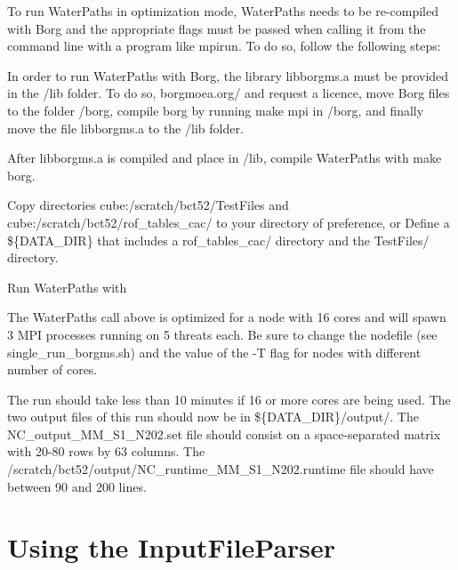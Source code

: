 To run Water\+Paths in optimization mode, Water\+Paths needs to be re-\/compiled with Borg and the appropriate flags must be passed when calling it from the command line with a program like mpirun. To do so, follow the following steps\+:
\begin{DoxyEnumerate}
\item In order to run Water\+Paths with Borg, the library libborgms.\+a must be provided in the /lib folder. To do so, borgmoea.\+org/ and request a licence, move Borg files to the folder /borg, compile borg by running {\ttfamily make mpi} in /borg, and finally move the file libborgms.\+a to the /lib folder.
\item After libborgms.\+a is compiled and place in /lib, compile Water\+Paths with {\ttfamily make borg}.
\item Copy directories cube\+:/scratch/bct52/\+Test\+Files and cube\+:/scratch/bct52/rof\+\_\+tables\+\_\+cac/ to your directory of preference, or Define a {\ttfamily \$\{D\+A\+T\+A\+\_\+\+D\+IR\}} that includes a {\ttfamily rof\+\_\+tables\+\_\+cac/} directory and the {\ttfamily Test\+Files/} directory.
\item Run Water\+Paths with 
 The Water\+Paths call above is optimized for a node with 16 cores and will spawn 3 M\+PI processes running on 5 threats each. Be sure to change the nodefile (see single\+\_\+run\+\_\+borgms.\+sh) and the value of the -\/T flag for nodes with different number of cores.
\item The run should take less than 10 minutes if 16 or more cores are being used. The two output files of this run should now be in {\ttfamily \$\{D\+A\+T\+A\+\_\+\+D\+IR\}/output/}. The N\+C\+\_\+output\+\_\+\+M\+M\+\_\+\+S1\+\_\+\+N202.\+set file should consist on a space-\/separated matrix with 20-\/80 rows by 63 columns. The /scratch/bct52/output/\+N\+C\+\_\+runtime\+\_\+\+M\+M\+\_\+\+S1\+\_\+\+N202.runtime file should have between 90 and 200 lines.
\end{DoxyEnumerate}

\section*{Using the Input\+File\+Parser}

